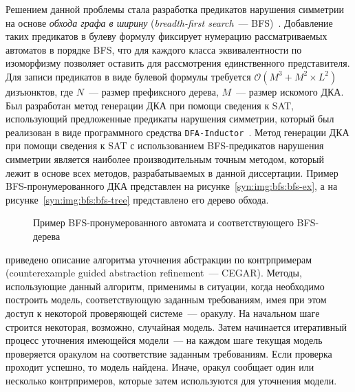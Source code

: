 Решением данной проблемы стала разработка предикатов нарушения симметрии на основе \emph{обхода графа в ширину} (\emph{breadth-first search}~--- BFS)~\cite{zakirzyanov2015LATA}.
Добавление таких предикатов в булеву формулу фиксирует нумерацию рассматриваемых автоматов в порядке BFS, что для каждого класса эквивалентности по изоморфизму позволяет оставить для рассмотрения единственного представителя.
Для записи предикатов в виде булевой формулы требуется $\mathcal{O}\left(M^{3} + M^{2} \times L^{2}\right)$ дизъюнктов, где $N$~--- размер префиксного дерева, $M$~--- размер искомого ДКА.
Был разработан метод генерации ДКА при помощи сведения к SAT, использующий предложенные предикаты нарушения симметрии, который был реализован в виде программного средства \texttt{DFA-Inductor}~\cite{dfa-inductor}. 
Метод генерации ДКА при помощи сведения к SAT с использованием BFS-предикатов нарушения симметрии является наиболее производительным точным методом, который лежит в основе всех методов, разрабатываемых в данной диссертации.
Пример BFS-пронумерованного ДКА представлен на рисунке~\ref{syn:img:bfs:bfs-ex}, а на рисунке~\ref{syn:img:bfs:bfs-tree} представлено его дерево обхода.

\begin{figure}[ht]
  \centering
  \hfill
  \caption{Пример BFS-пронумерованного автомата и соответствующего BFS-дерева}
  \label{syn:img:bfs}
\end{figure}

\insection{\ref{sec:review:cegar}} приведено описание алгоритма уточнения абстракции по контрпримерам (counterexample guided abstraction refinement~{---} CEGAR). 
Методы, использующие данный алгоритм, применимы в ситуации, когда необходимо построить модель, соответствующую заданным требованиям, имея при этом доступ к некоторой проверяющей системе~--- оракулу. 
На начальном шаге строится некоторая, возможно, случайная модель.
Затем начинается итеративный процесс уточнения имеющейся модели~--- на каждом шаге текущая модель проверяется оракулом на соответствие заданным требованиям. 
Если проверка проходит успешно, то модель найдена.
Иначе, оракул сообщает один или несколько контрпримеров, которые затем используются для уточнения модели.

